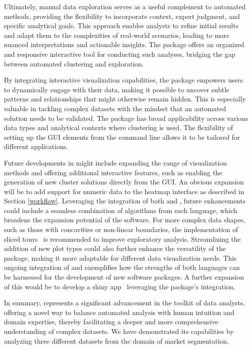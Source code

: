 \documentclass[article]{ajs}
\begin{document}
Ultimately, manual data exploration serves as a useful complement to automated methods, providing the flexibility to incorporate context, expert judgment, and specific analytical goals. This approach enables analysts to refine initial results and adapt them to the complexities of real-world scenarios, leading to more nuanced interpretations and actionable insights. The  package offers an organized and responsive interactive tool for conducting such analyses, bridging the gap between automated clustering and exploration.

By integrating interactive visualization capabilities, the  package empowers users to dynamically engage with their data, making it possible to uncover subtle patterns and relationships that might otherwise remain hidden. This is especially valuable in tackling complex datasets with the mindset that an automated solution needs to be validated. The package has broad applicability across various data types and analytical contexts where clustering is used. The flexibility of setting up the GUI elements from the command line allows it to be tailored for different applications.

Future developments in  might include expanding the range of visualization methods and offering additional interactive features, such as enabling the generation of new cluster solutions directly from the GUI. An obvious expansion will be to add support for numeric data to the heatmap interface as described in Section \ref{workflow}. Leveraging the integration of both  and , future enhancements could include a seamless combination of algorithms from each language, which broadens the expansion potential of the software. For more complex data shapes, such as those with concavities or non-linear boundaries, the implementation of sliced tours~\citep{Laa2020} is recommended to improve exploratory analysis. Streamlining the addition of new plot types could also further enhance the versatility of the package, making it more adaptable for different data visualization needs. This ongoing integration of  and  exemplifies how the strengths of both languages can be harnessed for the development of new software packages. A further expansion of this would be to develop a shiny app~\citep{shiny} leveraging the package's  integration. 

In summary,  represents a significant advancement in the toolkit of data analysts, offering a novel way to balance automated analysis with human intuition and domain expertise, thereby facilitating a deeper and more comprehensive understanding of complex datasets. We have demonstrated its capabilities by analyzing three different datasets from the domain of market segmentation. 
\end{document}
